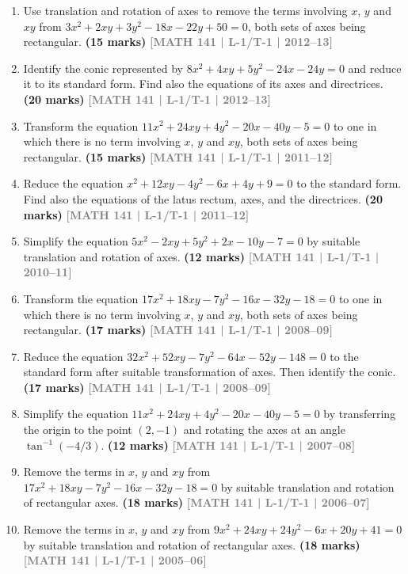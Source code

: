 \documentclass[12pt,a4paper]{article}
\newcommand{\yr}[1]{\hfill\textcolor{gray}{\small\textbf{[#1]}}}
\newcommand{\mk}[1]{\textcolor{orange!70!black}{\small\textbf{(#1 marks)}}}
\begin{document}
\begin{enumerate}
\item Use translation and rotation of axes to remove the terms involving $x$, $y$ and $xy$ from $3x^{2}+2xy+3y^{2}-18x-22y+50=0$, both sets of axes being rectangular.
\mk{15} \yr{MATH 141 | L-1/T-1 | 2012--13}

\item Identify the conic represented by $8x^{2}+4xy+5y^{2}-24x-24y=0$ and reduce it to its standard form. Find also the equations of its axes and directrices.
\mk{20} \yr{MATH 141 | L-1/T-1 | 2012--13}

\item Transform the equation $11x^{2}+24xy+4y^{2}-20x-40y-5=0$ to one in which there is no term involving $x$, $y$ and $xy$, both sets of axes being rectangular.
\mk{15} \yr{MATH 141 | L-1/T-1 | 2011--12}

\item Reduce the equation $x^{2}+12xy-4y^{2}-6x+4y+9=0$ to the standard form. Find also the equations of the latus rectum, axes, and the directrices.
\mk{20} \yr{MATH 141 | L-1/T-1 | 2011--12}

\item Simplify the equation $5x^{2}-2xy+5y^{2}+2x-10y-7=0$ by suitable translation and rotation of axes.
\mk{12} \yr{MATH 141 | L-1/T-1 | 2010--11}

\item Transform the equation $17x^{2}+18xy-7y^{2}-16x-32y-18=0$ to one in which there is no term involving $x$, $y$ and $xy$, both sets of axes being rectangular.
\mk{17} \yr{MATH 141 | L-1/T-1 | 2008--09}

\item Reduce the equation $32x^{2}+52xy-7y^{2}-64x-52y-148=0$ to the standard form after suitable transformation of axes. Then identify the conic.
\mk{17} \yr{MATH 141 | L-1/T-1 | 2008--09}

\item Simplify the equation $11x^{2}+24xy+4y^{2}-20x-40y-5=0$ by transferring the origin to the point $(2,-1)$ and rotating the axes at an angle $\tan^{-1}(-4/3)$.
\mk{12} \yr{MATH 141 | L-1/T-1 | 2007--08}

\item Remove the terms in $x$, $y$ and $xy$ from $17x^{2}+18xy-7y^{2}-16x-32y-18=0$ by suitable translation and rotation of rectangular axes.
\mk{18} \yr{MATH 141 | L-1/T-1 | 2006--07}

\item Remove the terms in $x$, $y$ and $xy$ from $9x^{2}+24xy+24y^{2}-6x+20y+41=0$ by suitable translation and rotation of rectangular axes.
\mk{18} \yr{MATH 141 | L-1/T-1 | 2005--06}


\end{enumerate}
\end{document}
